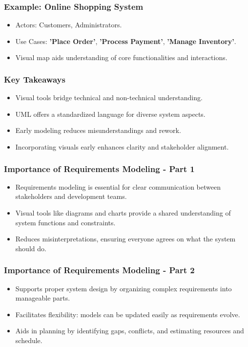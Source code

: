 \documentclass{beamer}
\begin{document}
\begin{frame}[fragile]
    \frametitle{Example: Online Shopping System}
    \begin{itemize}
        \item Actors: Customers, Administrators.
        \item Use Cases: \textbf{'Place Order'}, \textbf{'Process Payment'}, \textbf{'Manage Inventory'}.
        \item Visual map aids understanding of core functionalities and interactions.
    \end{itemize}
\end{frame}

\begin{frame}[fragile]
    \frametitle{Key Takeaways}
    \begin{itemize}
        \item Visual tools bridge technical and non-technical understanding.
        \item UML offers a standardized language for diverse system aspects.
        \item Early modeling reduces misunderstandings and rework.
        \item Incorporating visuals early enhances clarity and stakeholder alignment.
    \end{itemize}
\end{frame}

\begin{frame}[fragile]
    \frametitle{Importance of Requirements Modeling - Part 1}
    \begin{itemize}
        \item Requirements modeling is essential for clear communication between stakeholders and development teams.
        \item Visual tools like diagrams and charts provide a shared understanding of system functions and constraints.
        \item Reduces misinterpretations, ensuring everyone agrees on what the system should do.
    \end{itemize}
\end{frame}

\begin{frame}[fragile]
    \frametitle{Importance of Requirements Modeling - Part 2}
    \begin{itemize}
        \item Supports proper system design by organizing complex requirements into manageable parts.
        \item Facilitates flexibility: models can be updated easily as requirements evolve.
        \item Aids in planning by identifying gaps, conflicts, and estimating resources and schedule.
    \end{itemize}
\end{frame}
\end{document}
